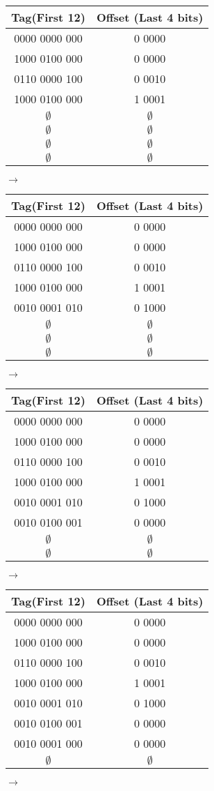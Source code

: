 \documentclass{exam}
\begin{document}
\begin{questions}
\begin{tabular}{c c}
\textbf{Tag(First 12)}&\textbf{Offset (Last 4 bits)}\\ [0.5ex]
\hline \hline
0000 0000 000 &0 0000\\
1000 0100 000 &0 0000\\
0110 0000 100 & 0 0010\\
1000 0100 000 & 1 0001\\
$\emptyset$ & $\emptyset$\\
$\emptyset$ & $\emptyset$\\
$\emptyset$ & $\emptyset$\\
$\emptyset$ & $\emptyset$\\
\end{tabular} $\rightarrow$
\begin{tabular}{c c}
\textbf{Tag(First 12)}&\textbf{Offset (Last 4 bits)}\\ [0.5ex]
\hline \hline
0000 0000 000 &0 0000\\
1000 0100 000 &0 0000\\
0110 0000 100 & 0 0010\\
1000 0100 000 & 1 0001\\
0010 0001 010 & 0 1000\\
$\emptyset$ & $\emptyset$\\
$\emptyset$ & $\emptyset$\\
$\emptyset$ & $\emptyset$\\
\end{tabular} $\rightarrow$

\begin{tabular}{c c}
\textbf{Tag(First 12)}&\textbf{Offset (Last 4 bits)}\\ [0.5ex]
\hline \hline
0000 0000 000 &0 0000\\
1000 0100 000 &0 0000\\
0110 0000 100 & 0 0010\\
1000 0100 000 & 1 0001\\
0010 0001 010 & 0 1000\\
0010 0100 001 & 0 0000\\
$\emptyset$ & $\emptyset$\\
$\emptyset$ & $\emptyset$\\
\end{tabular} $\rightarrow$
\begin{tabular}{c c}
\textbf{Tag(First 12)}&\textbf{Offset (Last 4 bits)}\\ [0.5ex]
\hline \hline
0000 0000 000 &0 0000\\
1000 0100 000 &0 0000\\
0110 0000 100 & 0 0010\\
1000 0100 000 & 1 0001\\
0010 0001 010 & 0 1000\\
0010 0100 001 & 0 0000\\
0010 0001 000 & 0 0000\\
$\emptyset$ & $\emptyset$\\
\end{tabular} $\rightarrow$


\end{questions}
\end{document}
